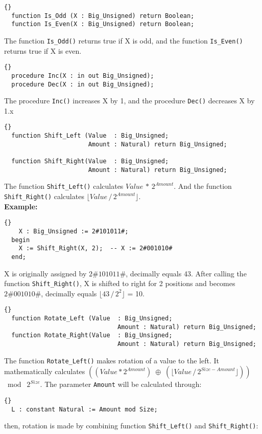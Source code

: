 \hhline
\begin{lstlisting}{}
  function Is_Odd (X : Big_Unsigned) return Boolean;
  function Is_Even(X : Big_Unsigned) return Boolean;
\end{lstlisting}
The function \texttt{Is\_Odd()} returns true if X is odd, and the
function \texttt{Is\_Even()} returns true if X is even.

\hhline
\begin{lstlisting}{}
  procedure Inc(X : in out Big_Unsigned);
  procedure Dec(X : in out Big_Unsigned);
\end{lstlisting}
The procedure \texttt{Inc()} increases X by 1, and the procedure
\texttt{Dec()} decreases X by 1.x

\hhline
\begin{lstlisting}{}
  function Shift_Left (Value  : Big_Unsigned;
                       Amount : Natural) return Big_Unsigned;

  function Shift_Right(Value  : Big_Unsigned;
                       Amount : Natural) return Big_Unsigned;
\end{lstlisting}
The function \texttt{Shift\_Left()} calculates
$Value\,*\,2^{Amount}$. And the function \texttt{Shift\_Right()}
calculates $\lfloor Value\, /\,
2^{Amount}\rfloor$.\\

\noindent\textbf{Example:}
\begin{lstlisting}{}
    X : Big_Unsigned := 2#101011#;
  begin
    X := Shift_Right(X, 2);  -- X := 2#001010#
  end;
\end{lstlisting}
X is originally assigned by $2\#101011\#$, decimally equals 43. After
calling the function \texttt{Shift\_Right()}, X is shifted to right
for 2 positions and becomes $2\#001010\#$, decimally equals $\lfloor
43\,/\,2^2 \rfloor$ = 10.

\hhline
\begin{lstlisting}{}
  function Rotate_Left (Value  : Big_Unsigned;
  							   Amount : Natural) return Big_Unsigned;
  function Rotate_Right(Value  : Big_Unsigned; 
  							   Amount : Natural) return Big_Unsigned;
\end{lstlisting}
The function \texttt{Rotate\_Left()} makes rotation of a value to the
left. It mathematically calculates $((Value * 2^{Amount})\; \oplus\;
(\lfloor Value\, /\, 2^{Size - Amount}\rfloor))$ $\bmod\; 2^{Size}$.
The parameter \texttt{Amount} will be calculated through:

\begin{lstlisting}{}
  L : constant Natural := Amount mod Size;
\end{lstlisting}
then, rotation is made by combining function \texttt{Shift\_Left()}
and \texttt{Shift\_Right()}:

